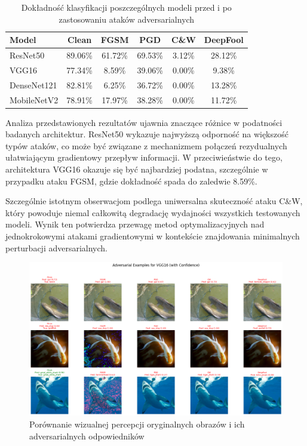 \documentclass[12pt]{article}
\begin{document}
\begin{table}[H]
    \centering
    \begin{tabular}{|l|c|c|c|c|c|}
    \hline
    \textbf{Model} & \textbf{Clean} & \textbf{FGSM} & \textbf{PGD} & \textbf{C\&W} & \textbf{DeepFool} \\
    \hline
    ResNet50 & 89.06\% & 61.72\% & 69.53\% & 3.12\% & 28.12\% \\
    VGG16 & 77.34\% & 8.59\% & 39.06\% & 0.00\% & 9.38\% \\
    DenseNet121 & 82.81\% & 6.25\% & 36.72\% & 0.00\% & 13.28\% \\
    MobileNetV2 & 78.91\% & 17.97\% & 38.28\% & 0.00\% & 11.72\% \\
    \hline
    \end{tabular}
    \caption{Dokładność klasyfikacji poszczególnych modeli przed i po zastosowaniu ataków adversarialnych}
    \label{tab:attack-results}
\end{table}

Analiza przedstawionych rezultatów ujawnia znaczące różnice w podatności badanych architektur. ResNet50 wykazuje najwyższą odporność na większość typów ataków, co może być związane z mechanizmem połączeń rezydualnych ułatwiającym gradientowy przepływ informacji. W przeciwieństwie do tego, architektura VGG16 okazuje się być najbardziej podatna, szczególnie w przypadku ataku FGSM, gdzie dokładność spada do zaledwie 8.59\%.

Szczególnie istotnym obserwacjom podlega uniwersalna skuteczność ataku C\&W, który powoduje niemal całkowitą degradację wydajności wszystkich testowanych modeli. Wynik ten potwierdza przewagę metod optymalizacyjnych nad jednokrokowymi atakami gradientowymi w kontekście znajdowania minimalnych perturbacji adversarialnych.

\begin{figure}[H]
    \centering
    \includegraphics[width=1\textwidth]{adversarial_examples.png}
    \caption{Porównanie wizualnej percepcji oryginalnych obrazów i ich adversarialnych odpowiedników}
    \label{fig:adversarial-examples}
\end{figure}
\end{document}
